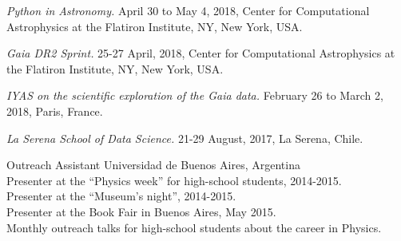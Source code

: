 \documentclass[10pt]{cv}
\newcommand\tab[1][1cm]{\hspace*{#1}}
\begin{document}
\begin{llist}
\textit{Python in Astronomy.}  April 30 to May 4, 2018, Center for Computational Astrophysics at the Flatiron Institute, NY, New York, USA. 

\textit{Gaia DR2 Sprint.} 25-27 April, 2018, Center for Computational Astrophysics at the Flatiron Institute, NY, New York, USA. 


\textit{IYAS on the scientific exploration of the Gaia data.} February 26 to March 2, 2018, Paris, France.

\textit{La Serena School of Data Science.} 21-29 August, 2017, La Serena, Chile.

Outreach Assistant
Universidad de Buenos Aires, Argentina\\
\tab Presenter at the ``Physics week'' for high-school students, 2014-2015.\\
\tab Presenter at the ``­Museum's night'', 2014-2015.\\
\tab Presenter at the Book Fair in Buenos Aires, May 2015.\\
\tab Monthly outreach talks for high-school students about the career in Physics.


\end{llist}
\end{document}
